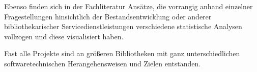 Ebenso finden sich in der Fachliteratur Ansätze, die vorrangig anhand einzelner
Fragestellungen hinsichtlich der Bestandsentwicklung \cite{hughes_long-term_2016} oder anderer
bibliothekarischer Servicedienstleistungen \cite{kutlay_shiny_2020, knievel_use_2006,meyer_using_2018} verschiedene statistische Analysen
vollzogen und diese visualisiert haben.


Fast alle Projekte sind an größeren
Bibliotheken mit ganz unterschiedlichen softwaretechnischen
Herangehensweisen \cite{finch_using_2016, wiegand_visualizing_2013} und Zielen \cite{phetteplace_effectively_2012} entstanden.





